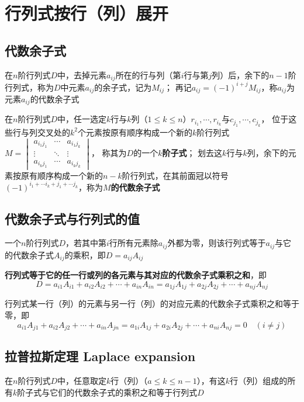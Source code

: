 \documentclass[UTF8]{ctexart}
\newcommand{\emplin}{\vspace{1em}}
\begin{document}
\section*{行列式按行（列）展开}
\subsection*{代数余子式}
在$n$阶行列式$D$中，去掉元素$a_{ij}$所在的行与列（第$i$行与第$j$列）后，余下的$n-1$阶行列式，称为$D$中元素$a_{ij}$的余子式，记为$M_{ij}$；
再记$a_{ij}=(-1)^{i+j}M_{ij}$，称$a_{ij}$为元素$a_{ij}$的代数余子式

\emplin
\emplin
\emplin

在$n$阶行列式$D$中，任一选定$k$行与$k$列（$1\le k\le n$）$r_{i_1},\cdots,r_{i_k}$与$c_{j_1},\cdots,c_{j_k}$，
位于这些行与列交叉处的$k^2$个元素按原有顺序构成一个新的$k$阶行列式$\displaystyle M=\begin{vmatrix}a_{i_1j_1}&\cdots&a_{i_1j_k}\\\vdots&\ddots&\vdots\\a_{i_kj_1}&\cdots&a_{i_kj_k}\end{vmatrix}$，
称其为$D$的一个\textbf{$k$阶子式}；
划去这$k$行与$k$列，余下的元素按原有顺序构成一个新的$n-k$阶行列式，在其前面冠以符号$(-1)^{i_1+\cdots i_k+j_1+\cdots j_k}$，称为\textbf{$M$的代数余子式}
\subsection*{代数余子式与行列式的值}
一个$n$阶行列式$D$，若其中第$i$行所有元素除$a_{ij}$外都为零，则该行列式等于$a_{ij}$与它的代数余子式$A_{ij}$的乘积，即$D=a_{ij}A_{ij}$

\emplin

\textbf{行列式等于它的任一行或列的各元素与其对应的代数余子式乘积之和}，即
\[D=a_{i1}A_{i1}+a_{i2}A_{i2}+\cdots+a_{in}A_{in}=a_{1j}A_{1j}+a_{2j}A_{2j}+\cdots+a_{nj}A_{nj}\]

\emplin

行列式某一行（列）的元素与另一行（列）的对应元素的代数余子式乘积之和等于零，即
\[a_{i1}A_{j1}+a_{i2}A_{j2}+\cdots+a_{in}A_{jn}=a_{1i}A_{1j}+a_{2i}A_{2j}+\cdots+a_{ni}A_{nj}=0\quad(i\ne j)\]

\subsection*{拉普拉斯定理 Laplace expansion}
在$n$阶行列式$D$中，任意取定$k$行（列）（$a\le k\le n-1$），有这$k$行（列）组成的所有$k$阶子式与它们的代数余子式的乘积之和等于行列式$D$
\end{document}
